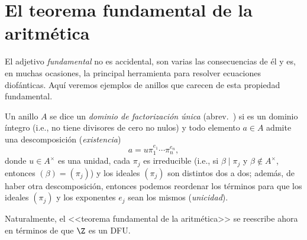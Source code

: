 \documentclass[11pt, reqno]{amsart}
\begin{document}
\begin{enumerate}



\end{enumerate}

\section{El teorema fundamental de la aritmética}
El adjetivo \emph{fundamental} no es accidental, son varias las consecuencias de él y es, en muchas ocasiones, la principal herramienta para
resolver ecuaciones diofánticas.
Aquí veremos ejemplos de anillos que carecen de esta propiedad fundamental.
\begin{mydef}
	Un anillo $A$ se dice un \emph{dominio de factorización única} (abrev.\ ) si es un dominio íntegro (i.e., no tiene
	divisores de cero no nulos) y todo elemento $a \in A$ admite una descomposición (\emph{existencia})
	\[
		a = u \pi_1^{e_1} \cdots \pi_n^{e_n},
	\]
	donde $u \in A^\times$ es una unidad, cada $\pi_j$ es irreducible (i.e., si $\beta \mid \pi_j$ y $\beta \notin A^\times$, entonces
	$(\beta) = (\pi_j)$) y los ideales $(\pi_j)$ son distintos dos a dos;
	además, de haber otra descomposición, entonces podemos reordenar los términos para que los ideales $(\pi_j)$ y los exponentes $e_j$
	sean los mismos (\emph{unicidad}).
\end{mydef}
Naturalmente, el <<teorema fundamental de la aritmética>> se reescribe ahora en términos de que $\Z$ es un DFU.
\end{document}

